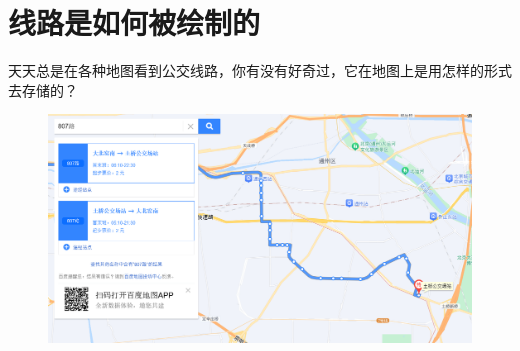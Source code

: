 \documentclass{beamer}
\begin{document}
\section{线路是如何被绘制的}

\begin{frame}
    \Large
    天天总是在各种地图看到公交线路，你有没有好奇过，它在地图上是用怎样的形式去存储的？
\end{frame}

\begin{frame}
	\begin{figure}[htpb]
		\centering
		\includegraphics[width=1.15\linewidth]{figure/map_example-baidu-webbus.png}
	\end{figure}
\end{frame}
\end{document}
